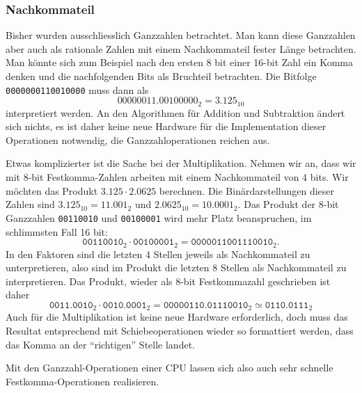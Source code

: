 \subsubsection{Nachkommateil}
Bisher wurden ausschliesslich Ganzzahlen betrachtet.
Man kann diese Ganzzahlen aber auch als rationale Zahlen mit einem
Nachkommateil fester Länge betrachten.
Man könnte sich zum Beispiel nach den ersten 8 bit einer 16-bit Zahl
ein Komma denken und die nachfolgenden Bits als Bruchteil
betrachten.
Die Bitfolge \texttt{0000000110010000} muss dann als
\[
00000011.00100000_2
=
3.125_{10}
\]
interpretiert werden.
An den Algorithmen für Addition und Subtraktion ändert sich nichts,
es ist daher keine neue Hardware für die Implementation dieser
Operationen notwendig, die Ganzzahloperationen reichen aus.

Etwas komplizierter ist die Sache bei der Multiplikation.
Nehmen wir an, dass wir mit 8-bit Festkomma-Zahlen arbeiten mit
einem Nachkommateil von 4 bits. 
Wir möchten das Produkt $3.125\cdot 2.0625$ berechnen.
Die Binärdarstellungen dieser Zahlen sind
$3.125_{10}=11.001_{2}$ und $2.0625_{10}= 10.0001_{2}$.
Das Produkt der 8-bit Ganzzahlen \texttt{00110010} und \texttt{00100001}
wird mehr Platz beanspruchen, im schlimmsten Fall 16 bit:
\[
\texttt{00110010}_2\cdot\texttt{00100001}_2
=
\texttt{0000011001110010}_2.
\]
In den Faktoren sind die letzten 4 Stellen jeweils als Nachkommateil
zu unterpretieren, also sind im Produkt die letzten 8 Stellen als
Nachkommateil zu interpretieren.
Das Produkt, wieder als 8-bit Festkommazahl geschrieben ist daher
\[
\texttt{0011.0010}_2\cdot\texttt{0010.0001}_2
=
\texttt{00000110.01110010}_2
\simeq
\texttt{0110.0111}_2
\]
Auch für die Multiplikation ist keine neue Hardware erforderlich,
doch muss das Resultat entsprechend mit Schiebeoperationen wieder
so formattiert werden, dass das Komma an der ``richtigen'' Stelle
landet.

Mit den Ganzzahl-Operationen einer CPU lassen sich also auch sehr
schnelle Festkomma-Ope\-ra\-tio\-nen realisieren.


